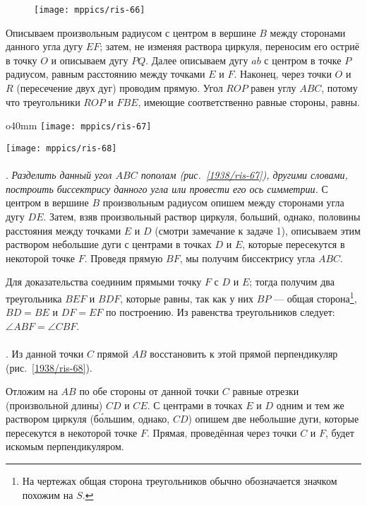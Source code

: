 \begin{figure}[!ht]
\centering
\texttt{[image: mppics/ris-66]}
\caption{}\label{1938/ris-66}
\end{figure}

Описываем произвольным радиусом с центром в вершине $B$ между сторонами данного угла дугу $EF$;
затем, не изменяя раствора циркуля, переносим его остриё в точку $O$ и описываем дугу $PQ$.
Далее описываем дугу $ab$ с центром в точке $P$ радиусом, равным расстоянию между точками $E$ и $F$.
Наконец, через точки $O$ и $R$ (пересечение двух дуг) проводим прямую.
Угол $ROP$ равен углу $ABC$, потому что треугольники $ROP$ и $FBE$, имеющие соответственно равные стороны, равны.

\begin{wrapfigure}{o}{40mm}
\vskip-4mm
\centering
\texttt{[image: mppics/ris-67]}
\caption{}\label{1938/ris-67}
\bigskip
\texttt{[image: mppics/ris-68]}
\caption{}\label{1938/ris-68}
\end{wrapfigure}

\paragraph{}\label{1938/64}
\mbox{.}
\emph{Разделить данный угол $ABC$ пополам (рис.~\ref{1938/ris-67}), другими словами, построить биссектрису данного угла или провести его ось симметрии.}
С центром в вершине $B$ произвольным радиусом опишем между сторонами угла дугу $DE$.
Затем, взяв произвольный раствор циркуля, больший, однако, половины расстояния между точками $E$ и $D$ (смотри замечание к задаче 1), описываем этим раствором небольшие дуги с центрами в точках $D$ и $E$, которые пересекутся в некоторой точке $F$.
Проведя прямую $BF$, мы получим биссектрису угла $ABC$.


Для доказательства соединим прямыми точку $F$ с $D$ и $E$;
тогда получим два треугольника $BEF$ и $BDF$, которые равны, так как у них $BP$ — общая сторона\footnote{На чертежах общая сторона треугольников обычно обозначается значком похожим на $S$.}, $BD=BE$ и $DF=EF$ по построению.
Из равенства треугольников следует:
$\angle ABF = \angle CBF$.

\paragraph{}\label{1938/65}
.
Из данной точки $C$ прямой $AB$ восстановить к этой прямой перпендикуляр (рис.~\ref{1938/ris-68}).

Отложим на $AB$ по обе стороны от данной точки $C$ равные отрезки (произвольной длины) $CD$ и $CE$.
С центрами в точках $E$ и $D$ одним и тем же раствором циркуля (б\'{о}льшим, однако, $CD$) опишем две небольшие дуги, которые пересекутся в некоторой точке $F$.
Прямая, проведённая через точки $C$ и $F$, будет искомым перпендикуляром.

